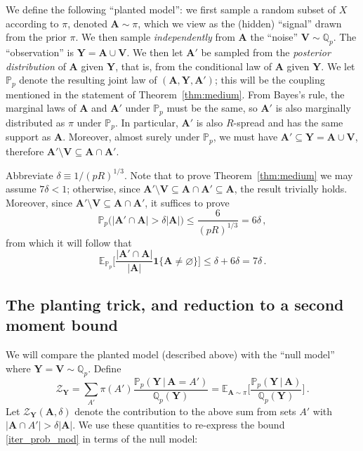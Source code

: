 \documentclass[11pt,reqno]{amsart}
\theoremstyle{plain}
\theoremstyle{definition}
\theoremstyle{remark}
\newcommand{\E}{\mathbb{E}}
\newcommand{\Q}{\mathbb{Q}}
\newcommand{\PP}{\mathbb{P}}
\newcommand{\EE}{\mathbb{E}}
\newcommand{\beq}{\begin{equation}}
\newcommand{\eeq}{\end{equation}}
\newcommand{\bA}{\mathbf{A}}
\newcommand{\bY}{\mathbf{Y}}
\newcommand{\bV}{\mathbf{V}}
\newcommand{\cZ}{\mathcal{Z}}
\renewcommand{\emptyset}{\varnothing}
\begin{document}
We define the following ``planted model'': we first sample a random subset of $X$ according to $\pi$, denoted $\bA\sim\pi$, which we view as the (hidden) ``signal'' drawn from the prior $\pi$. We then sample \emph{independently} from $\bA$ the ``noise'' $\bV \sim \Q_p$. The ``observation'' is $\bY=\bA \cup \bV$. We then let $\bA'$ be sampled from the \emph{posterior distribution} of $\bA$ given $\bY$, that is, from the conditional law of $\bA$ given $\bY$. We let $\PP_p$ denote the resulting {joint} law of $(\bA,\bY,\bA')$; this will be the coupling mentioned in the statement of Theorem~\ref{thm:medium}. From Bayes's rule, the marginal laws of $\bA$ and $\bA'$ under $\PP_p$ must be the same, so $\bA'$ is also marginally distributed as $\pi$ under $\PP_p$. In particular, $\bA'$ is also $R$-spread and has the same support as $\bA$. Moreover, almost surely under $\PP_p$, we must have $\bA'\subseteq \bY=\bA \cup \bV$, therefore $\bA' \setminus \bV \subseteq \bA \cap \bA'.$ 

Abbreviate $\delta\equiv 1/(pR)^{1/3}$. Note that to prove Theorem~\ref{thm:medium} we may assume $7\delta<1$; otherwise, since $\bA' \setminus \bV \subseteq \bA \cap \bA'\subseteq\bA$, the result trivially holds. Moreover, since $\bA' \setminus \bV \subseteq \bA \cap \bA'$, it suffices to prove 
    \beq\label{iter_prob_mod} 
    \PP_p\Big(
    |\bA' \cap \bA | > \delta|\bA|\Big) 
    \le \frac{6}{(pR)^{1/3}} =  6\delta\,,
    \eeq
    from which it will follow that
    \beq\label{iter_exp_2_mod}
    \EE_{\PP_p} \bigg[\frac{|\bA' \cap \bA |}{|\bA|} \mathbf{1}\{\bA\ne\emptyset \}\bigg]
    \le \delta +  6\delta = 7\delta\,.
    \eeq

\subsection{The planting trick, and reduction to a second moment bound}
\label{ss:planting.trick}
We will compare the planted model (described above) with the ``null model'' where $\bY=\bV\sim\Q_p$. Define
	\begin{equation}\label{e:Z.Y}
	\cZ_{\bY}
	=\sum_{A'} \pi(A')
	\frac{\PP_p(\bY\,|\,\bA=A')}{\Q_p(\bY)}
	= \E_{\bA\sim\pi}\bigg[
	\frac{\PP_p(\bY\,|\,\bA)}{\Q_p(\bY)}\bigg]\,.
	\end{equation}
Let $\cZ_{\bY}(\bA,\delta)$ denote the contribution to the above sum from sets $A'$ with $|\bA\cap A'| > \delta |\bA|$. We use these quantities to re-express the bound \eqref{iter_prob_mod} in terms of the null model: 
\end{document}
